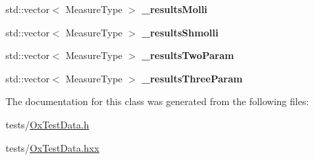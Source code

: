 \begin{DoxyCompactItemize}
\item 
\hypertarget{class_ox_1_1_test_data_a91ae0ccd1b9dea3b83bfc4d7c300dbb0}{std\-::vector$<$ Measure\-Type $>$ {\bfseries \-\_\-results\-Molli}}\label{class_ox_1_1_test_data_a91ae0ccd1b9dea3b83bfc4d7c300dbb0}

\item 
\hypertarget{class_ox_1_1_test_data_ac549cebd93bd96747a68e3680442adfd}{std\-::vector$<$ Measure\-Type $>$ {\bfseries \-\_\-results\-Shmolli}}\label{class_ox_1_1_test_data_ac549cebd93bd96747a68e3680442adfd}

\item 
\hypertarget{class_ox_1_1_test_data_a456aab7444f11ea99dd64a153e4b009c}{std\-::vector$<$ Measure\-Type $>$ {\bfseries \-\_\-results\-Two\-Param}}\label{class_ox_1_1_test_data_a456aab7444f11ea99dd64a153e4b009c}

\item 
\hypertarget{class_ox_1_1_test_data_aeaaf28f493e2add7c05a2418b5ed993d}{std\-::vector$<$ Measure\-Type $>$ {\bfseries \-\_\-results\-Three\-Param}}\label{class_ox_1_1_test_data_aeaaf28f493e2add7c05a2418b5ed993d}

\end{DoxyCompactItemize}


The documentation for this class was generated from the following files\-:\begin{DoxyCompactItemize}
\item 
tests/\hyperlink{_ox_test_data_8h}{Ox\-Test\-Data.\-h}\item 
tests/\hyperlink{_ox_test_data_8hxx}{Ox\-Test\-Data.\-hxx}\end{DoxyCompactItemize}
